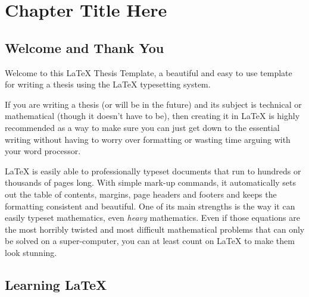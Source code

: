
\chapter{Chapter Title Here} %

\label{Chapter1} %


\newcommand{\keyword}[1]{\textbf{#1}}
\newcommand{\tabhead}[1]{\textbf{#1}}
\newcommand{\code}[1]{\texttt{#1}}
\newcommand{\file}[1]{\texttt{\bfseries#1}}
\newcommand{\option}[1]{\texttt{\itshape#1}}


\section{Welcome and Thank You}
Welcome to this \LaTeX{} Thesis Template, a beautiful and easy to use template for writing a thesis using the \LaTeX{} typesetting system.

If you are writing a thesis (or will be in the future) and its subject is technical or mathematical (though it doesn't have to be), then creating it in \LaTeX{} is highly recommended as a way to make sure you can just get down to the essential writing without having to worry over formatting or wasting time arguing with your word processor.

\LaTeX{} is easily able to professionally typeset documents that run to hundreds or thousands of pages long.
With simple mark-up commands, it automatically sets out the table of contents, margins, page headers and footers and keeps the formatting consistent and beautiful.
One of its main strengths is the way it can easily typeset mathematics, even \emph{heavy} mathematics.
Even if those equations are the most horribly twisted and most difficult mathematical problems that can only be solved on a super-computer, you can at least count on \LaTeX{} to make them look stunning.


\section{Learning \LaTeX{}}

